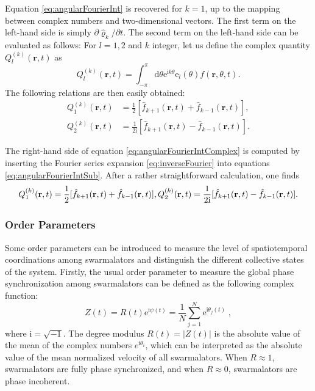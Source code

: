 \documentclass{article}
\begin{document}
Equation \eqref{eq:angularFourierInt} is recovered for $k = 1$, up to the mapping between complex numbers and two-dimensional vectors. The first term on the left-hand side is simply $\partial \hat{\varrho}_k/\partial t$. The second term on the left-hand side can be evaluated as follows: For $l=1,2$ and $k$ integer, let us define the complex quantity $Q_{l}^{\left( k \right)}\left( \mathbf{r},t \right)$ as 
\begin{equation}
    Q_l^{(k)}(\mathbf{r},t)=\int_{-\pi}^\pi\mathrm{d}\theta \mathrm{e}^{\mathrm{i}k\theta}\mathrm{e}_l(\theta)f(\mathbf{r},\theta,t).
\end{equation}
The following relations are then easily obtained:
\begin{equation}
    \begin{aligned}
        Q_{1}^{(k)}(\mathbf{r},t)&=\frac{1}{2}[\hat{f}_{k+1}(\mathbf{r},t)+\hat{f}_{k-1}(\mathbf{r},t)],\\
        Q_{2}^{(k)}(\mathbf{r},t)&=\frac{1}{2\mathrm{i}}[\hat{f}_{k+1}(\mathbf{r},t)-\hat{f}_{k-1}(\mathbf{r},t)].
    \end{aligned}
\end{equation}


The right-hand side of equation \eqref{eq:angularFourierIntComplex} is computed by inserting the Fourier series expansion \eqref{eq:inverseFourier} into equations \eqref{eq:angularFourierIntSub}. After a rather straightforward calculation, one finds
\begin{equation}
    Q_1^{(k)}(\mathbf{r},t)=\frac{1}{2}[\hat{f}_{k+1}(\mathbf{r},t)+\hat{f}_{k-1}(\mathbf{r},t)],\\Q_2^{(k)}(\mathbf{r},t)=\frac{1}{2\mathrm{i}}[\hat{f}_{k+1}(\mathbf{r},t)-\hat{f}_{k-1}(\mathbf{r},t)].
\end{equation}


\subsubsection{Order Parameters}
Some order parameters can be introduced to measure the level of spatiotemporal coordinations among swarmalators and distinguish the different collective states of the system. Firstly, the usual order parameter to measure the global phase synchronization among swarmalators can be defined as the following complex function:
\begin{equation}
    Z\left( t \right) =R\left( t \right) \mathrm{e}^{\textrm{i}\psi(t)}=\frac{1}{N}\sum_{j=1}^N{\mathrm{e}^{\textrm{i}\theta _j(t)}}\;,
\end{equation}
where $\textrm{i}=\sqrt{-1}$. The degree modulus $R(t)=\left|Z(t)\right|$ is the absolute value of the mean of the complex numbers $e^{\textrm{i}\theta _i}$, which can be interpreted as the absolute value of the mean normalized velocity of all swarmalators. When $R\approx 1$, swarmalators are fully phase synchronized, and when $R\approx0$, swarmalators are phase incoherent.
\end{document}
